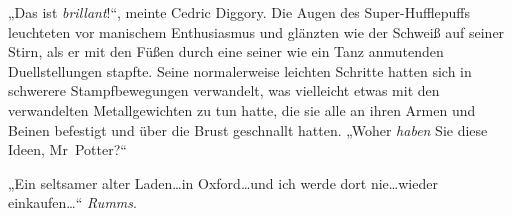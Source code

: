 „Das ist \emph{brillant}!“, meinte Cedric Diggory. Die Augen des Super-Hufflepuffs leuchteten vor manischem Enthusiasmus und glänzten wie der Schweiß auf seiner Stirn, als er mit den Füßen durch eine seiner wie ein Tanz anmutenden Duellstellungen stapfte. Seine normalerweise leichten Schritte hatten sich in schwerere Stampfbewegungen verwandelt, was vielleicht etwas mit den verwandelten Metallgewichten zu tun hatte, die sie alle an ihren Armen und Beinen befestigt und über die Brust geschnallt hatten. „Woher \emph{haben} Sie diese Ideen, Mr~Potter?“

„Ein seltsamer alter Laden…in Oxford…und ich werde dort nie…wieder einkaufen…“ \emph{Rumms}.

